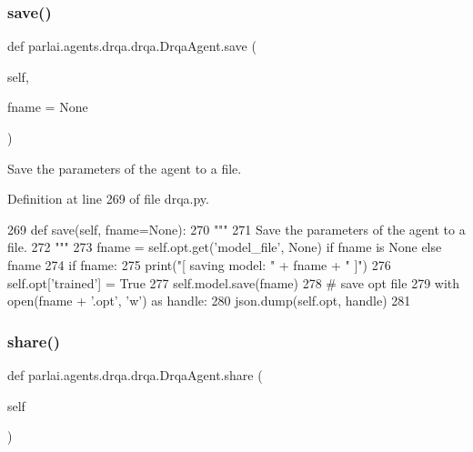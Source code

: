 \subsubsection{\texorpdfstring{save()}{save()}}
{\footnotesize\ttfamily def parlai.\+agents.\+drqa.\+drqa.\+Drqa\+Agent.\+save (\begin{DoxyParamCaption}\item[{}]{self,  }\item[{}]{fname = {\ttfamily None} }\end{DoxyParamCaption})}

\begin{DoxyVerb}Save the parameters of the agent to a file.
\end{DoxyVerb}
 

Definition at line 269 of file drqa.\+py.


\begin{DoxyCode}
269     \textcolor{keyword}{def }save(self, fname=None):
270         \textcolor{stringliteral}{"""}
271 \textcolor{stringliteral}{        Save the parameters of the agent to a file.}
272 \textcolor{stringliteral}{        """}
273         fname = self.opt.get(\textcolor{stringliteral}{'model\_file'}, \textcolor{keywordtype}{None}) \textcolor{keywordflow}{if} fname \textcolor{keywordflow}{is} \textcolor{keywordtype}{None} \textcolor{keywordflow}{else} fname
274         \textcolor{keywordflow}{if} fname:
275             print(\textcolor{stringliteral}{"[ saving model: "} + fname + \textcolor{stringliteral}{" ]"})
276             self.opt[\textcolor{stringliteral}{'trained'}] = \textcolor{keyword}{True}
277             self.model.save(fname)
278             \textcolor{comment}{# save opt file}
279             with open(fname + \textcolor{stringliteral}{'.opt'}, \textcolor{stringliteral}{'w'}) \textcolor{keyword}{as} handle:
280                 json.dump(self.opt, handle)
281 
\end{DoxyCode}
\mbox{\label{classparlai_1_1agents_1_1drqa_1_1drqa_1_1DrqaAgent_a7346d6aa37ecb54779c9cf67a0ffef39}} 
\subsubsection{\texorpdfstring{share()}{share()}}
{\footnotesize\ttfamily def parlai.\+agents.\+drqa.\+drqa.\+Drqa\+Agent.\+share (\begin{DoxyParamCaption}\item[{}]{self }\end{DoxyParamCaption})}



